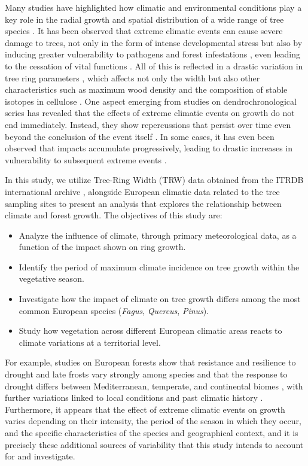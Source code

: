 \documentclass[12pt, a4paper]{article}
\begin{document}
Many studies have highlighted how climatic and environmental conditions play a key role in the radial growth and spatial distribution of a wide range of tree species \parencite{martinezdelcastillo2022}. It has been observed that extreme climatic events can cause severe damage to trees, not only in the form of intense developmental stress but also by inducing greater vulnerability to pathogens and forest infestations \parencite{allen2010}, even leading to the cessation of vital functions \parencite{anderegg2019}. All of this is reflected in a drastic variation in tree ring parameters \parencite{bauwe2015}, which affects not only the width but also other characteristics such as maximum wood density \parencite{michelot2012} and the composition of stable isotopes in cellulose \parencite{gessler2018, nagavciuc2020}. One aspect emerging from studies on dendrochronological series has revealed that the effects of extreme climatic events on growth do not end immediately. Instead, they show repercussions that persist over time even beyond the conclusion of the event itself \parencite{bouwman2025, huang2018}. In some cases, it has even been observed that impacts accumulate progressively, leading to drastic increases in vulnerability to subsequent extreme events \parencite{muller2022, wang2025}.

In this study, we utilize Tree-Ring Width (TRW) data obtained from the ITRDB international archive \parencite{zhao2019}, alongside European climatic data related to the tree sampling sites to present an analysis that explores the relationship between climate and forest growth. The objectives of this study are:

\begin{itemize}
\item Analyze the influence of climate, through primary meteorological data, as a function of the impact shown on ring growth.
\item Identify the period of maximum climate incidence on tree growth within the vegetative season.
\item Investigate how the impact of climate on tree growth differs among the most common European species (\textit{Fagus}, \textit{Quercus}, \textit{Pinus}).
\item Study how vegetation across different European climatic areas reacts to climate variations at a territorial level.
\end{itemize}

For example, studies on European forests show that resistance and resilience to drought and late frosts vary strongly among species \parencite{vitasse2019} and that the response to drought differs between Mediterranean, temperate, and continental biomes \parencite{gazol2018}, with further variations linked to local conditions and past climatic history \parencite{gazol2020}. Furthermore, it appears that the effect of extreme climatic events on growth varies depending on their intensity, the period of the season in which they occur, and the specific characteristics of the species and geographical context, and it is precisely these additional sources of variability that this study intends to account for and investigate.
\end{document}
